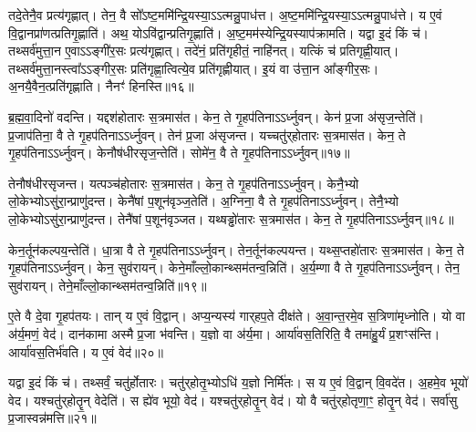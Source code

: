 तदे॒तेनै॒व प्रत्य॑गृह्णात्।
तेन॒ वै सो᳚\-ऽष्ट॒ममि॑न्द्रि॒य\-स्या॒\-ऽऽत्मन्नु॒पा\-ध॑त्त।
अ॒ष्ट॒ममि॑न्द्रि॒य\-स्या॒\-ऽऽत्मन्नु॒पा\-ध॑त्ते।
य ए॒वं वि॒द्वानप्रा॑णत्प्रति\-गृ॒ह्णाति॑।
अथ॒ योऽवि॑द्वान्प्रति\-गृ॒ह्णाति॑।
अ॒ष्ट॒मम॑स्येन्द्रि॒य\-स्याप॑\-क्रामति।
यद्वा इ॒दं किं च॑।
तथ्सर्व॑मुत्ता॒न ए॒वा\-ऽऽङ्गी॑र॒सः प्रत्य॑\-गृह्णात्।
तदे॑नं॒ प्रति॑\-गृहीतं॒ नाहि॑नत्।
यत्किं च॑ प्रति\-गृह्णी॒यात्।
तथ्सर्व॑मुत्ता॒नस्त्वा᳚\-ऽऽङ्गीर॒सः प्रति॑\-गृह्णा॒त्वित्ये॒व प्रति॑\-गृह्णीयात्।
इ॒यं वा उ॑त्ता॒न आ᳚ङ्गीर॒सः।
अ॒नयै॒वैन॒त्प्रति॑\-गृह्णाति।
नैनꣳ॑ हिनस्ति॥१६॥

ब्र॒ह्म॒वा॒दिनो॑ वदन्ति।
यद्दश॑होतारः स॒त्रमास॑त।
केन॒ ते गृ॒हप॑तिना\-ऽऽर्ध्नुवन्।
केन॑ प्र॒जा अ॑सृज॒न्तेति॑।
प्र॒जा\-प॑तिना॒ वै ते गृ॒हप॑तिना\-ऽऽर्ध्नुवन्।
तेन॑ प्र॒जा अ॑सृजन्त।
यच्चतु॑र्‌\mbox{}होतारः स॒त्रमास॑त।
केन॒ ते गृ॒हप॑तिना\-ऽऽर्ध्नुवन्।
केनौष॑धीरसृज॒न्तेति॑।
सोमे॑न॒ वै ते गृ॒हप॑तिना\-ऽऽर्ध्नुवन्॥१७॥

तेनौष॑धीरसृजन्त।
यत्पञ्च॑होतारः स॒त्रमास॑त।
केन॒ ते गृ॒हप॑तिना\-ऽऽर्ध्नुवन्।
केनै॒भ्यो लो॒केभ्यो\-ऽसु॑रा॒न्प्राणु॑दन्त।
केनै॑षां प॒शून॑वृञ्ज॒तेति॑।
अ॒ग्निना॒ वै ते गृ॒हप॑तिना\-ऽऽर्ध्नुवन्।
तेनै॒भ्यो लो॒केभ्यो\-ऽसु॑रा॒न्प्राणु॑दन्त।
तेनै॑षां प॒शून॑वृञ्जत।
यथ्षड्ढो॑तारः स॒त्रमास॑त।
केन॒ ते गृ॒हप॑तिना\-ऽऽर्ध्नुवन्॥१८॥

केन॒र्तून॑कल्पय॒न्तेति॑।
धा॒त्रा वै ते गृ॒हप॑तिना\-ऽऽर्ध्नुवन्।
तेन॒र्तून॑कल्पयन्त।
यथ्स॒प्तहो॑तारः स॒त्रमास॑त।
केन॒ ते गृ॒हप॑तिना\-ऽऽर्ध्नुवन्।
केन॒ सुव॑रायन्।
केने॒माँल्लो॒कान्थ्सम॑\-तन्व॒न्निति॑।
अ॒र्य॒म्णा वै ते गृ॒हप॑तिना\-ऽऽर्ध्नुवन्।
तेन॒ सुव॑रायन्।
तेने॒माँल्लो॒कान्थ्सम॑तन्व॒न्निति॑॥१९॥

ए॒ते वै दे॒वा गृ॒हप॑तयः।
तान् य ए॒वं वि॒द्वान्।
अप्य॒न्यस्य॑ गार्‌\mbox{}हप॒ते दीक्ष॑ते।
अ॒वा॒न्त॒रमे॒व स॒त्रिणा॑मृध्नोति।
यो वा अ॑र्य॒मणं॒ वेद॑।
दान॑कामा अस्मै प्र॒जा भ॑वन्ति।
य॒ज्ञो वा अ॑र्य॒मा।
आर्या॑वस॒तिरिति॒ वै तमा॑हु॒र्यं प्र॒शꣳस॑न्ति।
आर्या॑वस॒तिर्भ॑वति।
य ए॒वं वेद॑॥२०॥

यद्वा इ॒दं किं च॑।
तथ्सर्वं॒ चतु॑र्\mbox{}होतारः।
चतु॑र्‌\mbox{}होतृ॒भ्योऽधि॑ य॒ज्ञो निर्मि॑तः।
स य ए॒वं वि॒द्वान्‌ वि॒वदे॑त।
अ॒हमे॒व भूयो॑ वेद।
यश्चतु॑र्‌\mbox{}होतॄ॒न् वेदेति॑।
स ह्ये॑व भूयो॒ वेद॑।
यश्चतु॑र्‌\mbox{}होतॄ॒न् वेद॑।
यो वै चतु॑र्‌\mbox{}होतृणा॒ꣳ॒ होतॄ॒न् वेद॑।
सर्वा॑सु प्र॒जास्वन्न॑मत्ति॥२१॥

